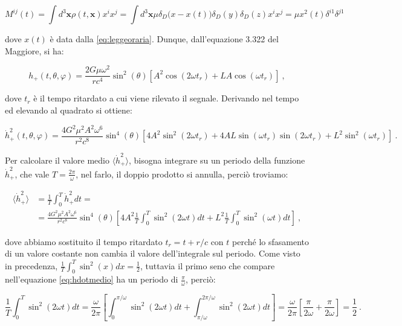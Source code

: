 \documentclass[a4paper,10pt]{article}
\begin{document}
\begin{equation} \label{eq:Mij}
    M^{ij}(t) = \int d^3\boldsymbol x \rho(t, \boldsymbol x) x^i x^j = \int d^3\boldsymbol x \mu \delta_D \big( x - x(t) \big) \delta_D(y) \delta_D(z) x^i x^j = \mu x^2(t) \delta^{i1} \delta^{j1}
\end{equation}

dove $x(t)$ è data dalla \eqref{eq:leggeoraria}. Dunque, dall'equazione 3.322 del Maggiore, si ha:

\begin{equation} \label{eq:hplus}
    h_+(t, \theta, \varphi) = \frac{2G \mu \omega^2}{r c^4} \sin^2(\theta) [A^2 \cos(2 \omega t_{r}) + LA \cos(\omega t_r)] \ ,
\end{equation}

dove $t_r$ è il tempo ritardato a cui viene rilevato il segnale. Derivando nel tempo ed elevando al quadrato si ottiene:

\begin{equation} \label{eq:hplusdot2}
    \dot h_+^2(t, \theta, \varphi) = \frac{4 G^2 \mu^2 A^2 \omega^6}{r^2 c^8} \sin^4 (\theta) [4A^2 \sin^2(2\omega t_r) + 4AL \sin(\omega t_r) \sin(2 \omega t_r) + L^2 \sin^2(\omega t_r)] \ .
\end{equation}

Per calcolare il valore medio $\langle \dot h_+^2 \rangle$, bisogna integrare su un periodo della funzione $\dot h_+^2$, che vale $T=\frac{2\pi}{\omega}$, nel farlo, il doppio prodotto si annulla, perciò troviamo:

\begin{equation} \label{eq:hdotmedio}
\begin{aligned}
    \langle \dot h_+^2 \rangle  &= \frac{1}{T} \int_0^T \dot h_+^2 dt = \\
                                &= \frac{4 G^2 \mu^2 A^2 \omega^6}{r^2 c^8} \sin^4 (\theta) \left[ 4A^2 \frac{1}{T} \int_0^T \sin^2(2\omega t) dt + L^2 \frac{1}{T} \int_0^T \sin^2(\omega t) dt \right] \ ,
\end{aligned}
\end{equation}

dove abbiamo sostituito il tempo ritardato $t_r = t + r/c$ con $t$ perché lo sfasamento di un valore costante non cambia il valore dell'integrale sul periodo.
Come visto in precedenza, $\frac{1}{T}\int_0^T\sin^2(x)dx = \frac{1}{2}$, tuttavia il primo seno che compare nell'equazione \eqref{eq:hdotmedio} ha un periodo di $\frac{\pi}{\omega}$, perciò:

\begin{equation} \label{eq:integraleperiodo}
    \frac{1}{T}\int_0^T\sin^2(2 \omega t)dt = \frac{\omega}{2 \pi} \left[ \int_0^{\pi/\omega} \sin^2(2\omega t) dt + \int_{\pi/\omega}^{2\pi/\omega} \sin^2(2\omega t) dt \right] = \frac{\omega}{2 \pi} \left[ \frac{\pi}{2 \omega} + \frac{\pi}{2 \omega} \right] = \frac{1}{2} \ .
\end{equation}
\end{document}
